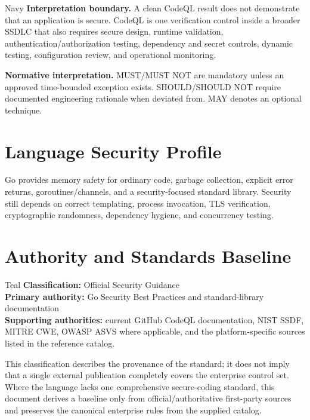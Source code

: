\documentclass[10pt,letterpaper]{article}
\begin{document}
\begin{callout}{Navy}
\textbf{Interpretation boundary.} A clean CodeQL result does not demonstrate that an application is secure. CodeQL is one verification control inside a broader SSDLC that also requires secure design, runtime validation, authentication/authorization testing, dependency and secret controls, dynamic testing, configuration review, and operational monitoring.
\end{callout}

\textbf{Normative interpretation.} MUST/MUST NOT are mandatory unless an approved time-bounded exception exists. SHOULD/SHOULD NOT require documented engineering rationale when deviated from. MAY denotes an optional technique.

\section{Language Security Profile}
Go provides memory safety for ordinary code, garbage collection, explicit error returns, goroutines/channels, and a security-focused standard library. Security still depends on correct templating, process invocation, TLS verification, cryptographic randomness, dependency hygiene, and concurrency testing.
\section{Authority and Standards Baseline}
\begin{callout}{Teal}
\textbf{Classification:} Official Security Guidance\\
\textbf{Primary authority:} Go Security Best Practices and standard-library documentation\\
\textbf{Supporting authorities:} current GitHub CodeQL documentation, NIST SSDF, MITRE CWE, OWASP ASVS where applicable, and the platform-specific sources listed in the reference catalog.
\end{callout}
This classification describes the provenance of the standard; it does not imply that a single external publication completely covers the enterprise control set. Where the language lacks one comprehensive secure-coding standard, this document derives a baseline only from official/authoritative first-party sources and preserves the canonical enterprise rules from the supplied catalog.
\end{document}
